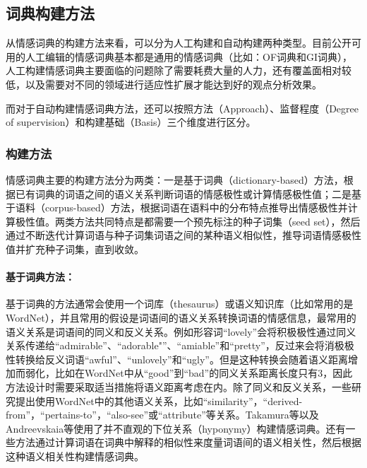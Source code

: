 \subsection{词典构建方法}
从情感词典的构建方法来看，可以分为人工构建和自动构建两种类型。目前公开可用的人工编辑的情感词典基本都是通用的情感词典（比如：OF词典和GI词典），人工构建情感词典主要面临的问题除了需要耗费大量的人力，还有覆盖面相对较低，以及需要对不同的领域进行适应性扩展才能达到好的观点分析效果。

而对于自动构建情感词典方法，还可以按照方法（Approach）、监督程度（Degree of supervision）和构建基础（Basis）三个维度进行区分。

\subsubsection{构建方法}
情感词典主要的构建方法分为两类：一是基于词典（dictionary-based）方法，根据已有词典的词语之间的语义关系判断词语的情感极性或计算情感极性值；二是基于语料（corpus-based）方法，根据词语在语料中的分布特点推导出情感极性并计算极性值。两类方法共同特点是都需要一个预先标注的种子词集（seed set），然后通过不断迭代计算词语与种子词集词语之间的某种语义相似性，推导词语情感极性值并扩充种子词集，直到收敛。

\paragraph{基于词典方法：}
基于词典的方法通常会使用一个词库（thesaurus）或语义知识库（比如常用的是WordNet），并且常用的假设是词语间的语义关系转换词语的情感信息，最常用的语义关系是词语间的同义和反义关系。例如形容词“lovely”会将积极极性通过同义关系传递给“admirable”、“adorable"”、“amiable”和“pretty”，反过来会将消极极性转换给反义词语“awful”、“unlovely”和“ugly”。但是这种转换会随着语义距离增加而弱化，比如在WordNet中从“good”到“bad”的同义关系距离长度只有3，因此方法设计时需要采取适当措施将语义距离考虑在内。除了同义和反义关系，一些研究提出使用WordNet中的其他语义关系，比如“similarity”，“derived-from”，“pertains-to”，“also-see”或“attribute”等关系。Takamura等以及Andreevskaia等使用了并不直观的下位关系（hyponymy）构建情感词典。还有一些方法通过计算词语在词典中解释的相似性来度量词语间的语义相关性，然后根据这种语义相关性构建情感词典。

